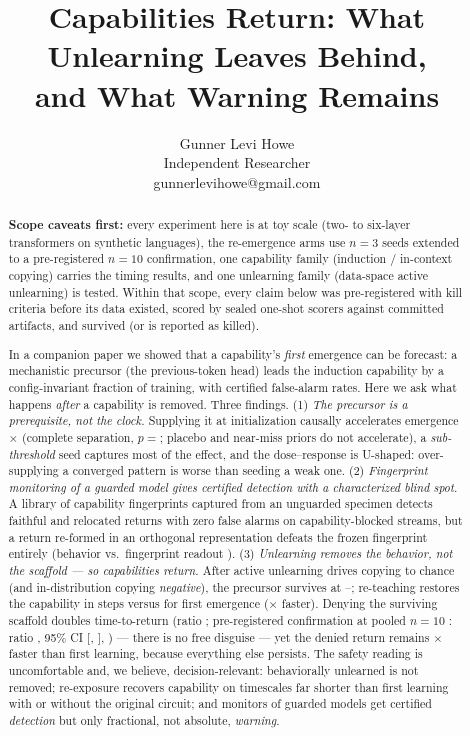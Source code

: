 \documentclass[11pt]{article}
\title{Capabilities Return: What Unlearning Leaves Behind,\\ and What Warning Remains}
\author{Gunner Levi Howe\\ \small Independent Researcher\\ \small gunnerlevihowe@gmail.com}
\date{}
\begin{document}
\maketitle

\begin{abstract}
\noindent\textbf{Scope caveats first:} every experiment here is at toy scale (two- to
six-layer transformers on synthetic languages), the re-emergence arms use $n{=}3$ seeds
extended to a pre-registered $n{=}10$ confirmation, one capability family (induction /
in-context copying) carries the timing results, and one unlearning family
(data-space active unlearning) is tested. Within that scope, every claim below was
pre-registered with kill criteria before its data existed, scored by sealed one-shot
scorers against committed artifacts, and survived (or is reported as killed).

In a companion paper we showed that a capability's \emph{first} emergence can be
forecast: a mechanistic precursor (the previous-token head) leads the induction
capability by a config-invariant fraction of training, with certified false-alarm rates.
Here we ask what happens \emph{after} a capability is removed. Three findings. (1)
\emph{The precursor is a prerequisite, not the clock.} Supplying it at initialization
causally accelerates emergence \PsevenSpeedup$\times$ (complete separation,
$p={}$\PsevenExactP; placebo and near-miss priors do not accelerate), a
\emph{sub-threshold} seed captures most of the effect, and the dose--response is
U-shaped: over-supplying a converged pattern is worse than seeding a weak one. (2)
\emph{Fingerprint monitoring of a guarded model gives certified detection with a
characterized blind spot.} A library of capability fingerprints captured from an
unguarded specimen detects faithful and relocated returns with zero false alarms on
capability-blocked streams, but a return re-formed in an orthogonal representation
defeats the frozen fingerprint entirely (behavior \PilotIdioFinalAcc{} vs.\ fingerprint
readout \PilotIdioFinalStruct). (3) \emph{Unlearning removes the behavior, not the
scaffold --- so capabilities return.} After active unlearning drives copying to chance
(and in-distribution copying \emph{negative}), the precursor survives at
\RtwoScaffoldLo--\RtwoScaffoldHi; re-teaching restores the capability in
\RtwoFaithMed{} steps versus \PsevenTzero{} for first emergence
(\RtwoRelearnX$\times$ faster). Denying the surviving scaffold doubles time-to-return
(ratio \RtwoBRatio; pre-registered confirmation at pooled $n{=}10$
\ifnum{} : ratio \RtwoCRatio{}, 95\% CI [\RtwoCCIlo, \RtwoCCIhi],
\RtwoCVerdict\fi) --- there is no free disguise --- yet the denied return remains
\RtwoBDeniedVsFirstX$\times$ faster than first learning, because everything else
persists. The safety reading is uncomfortable and, we believe, decision-relevant:
behaviorally unlearned is not removed; re-exposure recovers capability on timescales
far shorter than first learning with or without the original circuit; and monitors of
guarded models get certified \emph{detection} but only fractional, not absolute,
\emph{warning}.
\end{abstract}
\end{document}
